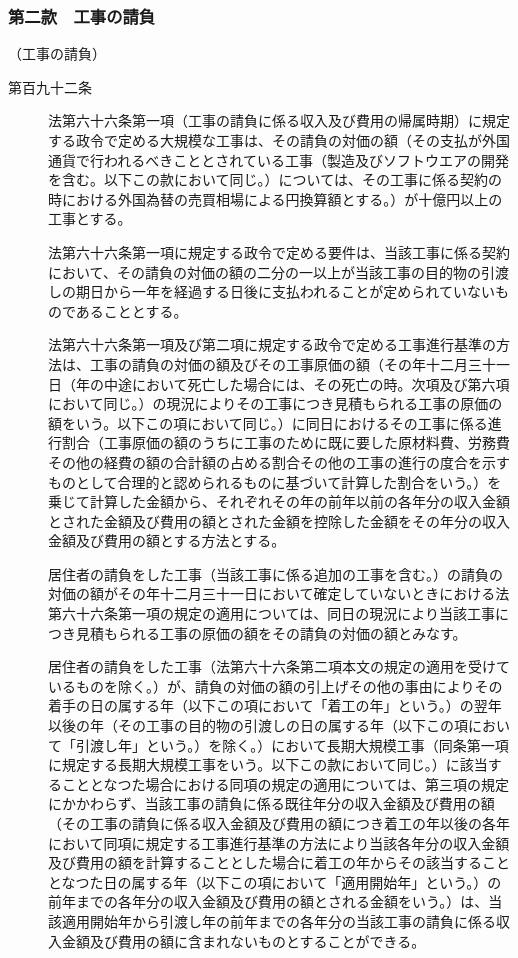 \documentclass[twocolumn,a4j,10pt]{ltjtarticle}
\begin{document}
\subsubsection*{第二款　工事の請負}
\noindent\hspace{10pt}（工事の請負）
\begin{description}
\item[第百九十二条]法第六十六条第一項（工事の請負に係る収入及び費用の帰属時期）に規定する政令で定める大規模な工事は、その請負の対価の額（その支払が外国通貨で行われるべきこととされている工事（製造及びソフトウエアの開発を含む。以下この款において同じ。）については、その工事に係る契約の時における外国為替の売買相場による円換算額とする。）が十億円以上の工事とする。
\item[]法第六十六条第一項に規定する政令で定める要件は、当該工事に係る契約において、その請負の対価の額の二分の一以上が当該工事の目的物の引渡しの期日から一年を経過する日後に支払われることが定められていないものであることとする。
\item[]法第六十六条第一項及び第二項に規定する政令で定める工事進行基準の方法は、工事の請負の対価の額及びその工事原価の額（その年十二月三十一日（年の中途において死亡した場合には、その死亡の時。次項及び第六項において同じ。）の現況によりその工事につき見積もられる工事の原価の額をいう。以下この項において同じ。）に同日におけるその工事に係る進行割合（工事原価の額のうちに工事のために既に要した原材料費、労務費その他の経費の額の合計額の占める割合その他の工事の進行の度合を示すものとして合理的と認められるものに基づいて計算した割合をいう。）を乗じて計算した金額から、それぞれその年の前年以前の各年分の収入金額とされた金額及び費用の額とされた金額を控除した金額をその年分の収入金額及び費用の額とする方法とする。
\item[]居住者の請負をした工事（当該工事に係る追加の工事を含む。）の請負の対価の額がその年十二月三十一日において確定していないときにおける法第六十六条第一項の規定の適用については、同日の現況により当該工事につき見積もられる工事の原価の額をその請負の対価の額とみなす。
\item[]居住者の請負をした工事（法第六十六条第二項本文の規定の適用を受けているものを除く。）が、請負の対価の額の引上げその他の事由によりその着手の日の属する年（以下この項において「着工の年」という。）の翌年以後の年（その工事の目的物の引渡しの日の属する年（以下この項において「引渡し年」という。）を除く。）において長期大規模工事（同条第一項に規定する長期大規模工事をいう。以下この款において同じ。）に該当することとなつた場合における同項の規定の適用については、第三項の規定にかかわらず、当該工事の請負に係る既往年分の収入金額及び費用の額（その工事の請負に係る収入金額及び費用の額につき着工の年以後の各年において同項に規定する工事進行基準の方法により当該各年分の収入金額及び費用の額を計算することとした場合に着工の年からその該当することとなつた日の属する年（以下この項において「適用開始年」という。）の前年までの各年分の収入金額及び費用の額とされる金額をいう。）は、当該適用開始年から引渡し年の前年までの各年分の当該工事の請負に係る収入金額及び費用の額に含まれないものとすることができる。

\end{description}
\end{document}

